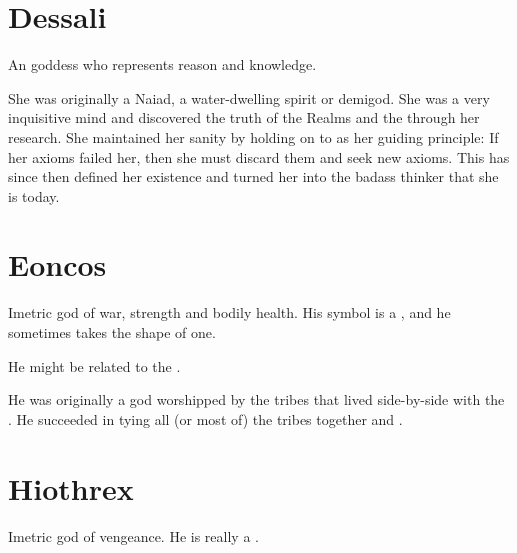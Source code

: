 \section{Dessali}
An  goddess who represents reason and knowledge. 

She was originally a Naiad, a water-dwelling spirit or demigod. 
She was a very inquisitive mind and discovered the truth of the Realms and the \feud{} through her research. 
She maintained her sanity by holding on to  as her guiding principle: If her axioms failed her, then she must discard them and seek new axioms. 
This has since then defined her existence and turned her into the badass thinker that she is today. 















\section{Eoncos}
Imetric god of war, strength and bodily health. 
His symbol is a \nycan, and he sometimes takes the shape of one. 

He might be related to the . 

He was originally a \nycan{} god worshipped by the \nycaneer{} tribes that lived side-by-side with the \Ortaicans. 
He succeeded in tying all (or most of) the tribes together and . 















\section{Hiothrex}
Imetric god of vengeance. 
He is really a . 















